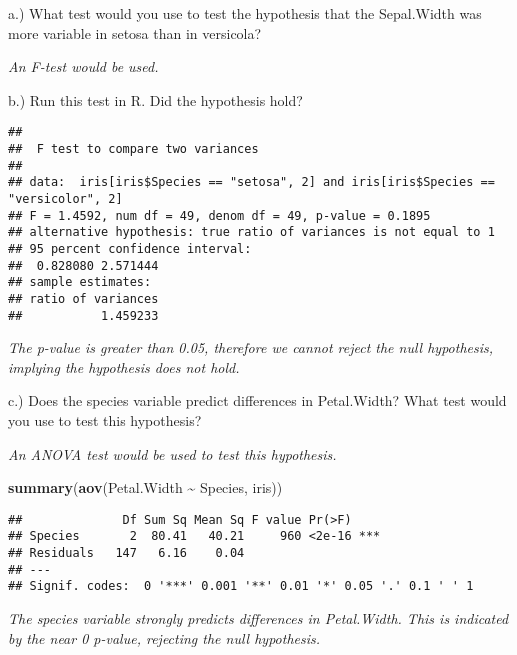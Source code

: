 \documentclass[
]{article}
\newenvironment{Shaded}{\begin{snugshade}}{\end{snugshade}}
\newcommand{\DecValTok}[1]{\textcolor[rgb]{0.00,0.00,0.81}{#1}}
\newcommand{\FunctionTok}[1]{\textcolor[rgb]{0.13,0.29,0.53}{\textbf{#1}}}
\newcommand{\NormalTok}[1]{#1}
\newcommand{\SpecialCharTok}[1]{\textcolor[rgb]{0.81,0.36,0.00}{\textbf{#1}}}
\newcommand{\StringTok}[1]{\textcolor[rgb]{0.31,0.60,0.02}{#1}}
\begin{document}
a.) What test would you use to test the hypothesis that the Sepal.Width
was more variable in setosa than in versicola?

\emph{An F-test would be used.}

b.) Run this test in R. Did the hypothesis hold?

\begin{Shaded}
\end{Shaded}

\begin{verbatim}
## 
##  F test to compare two variances
## 
## data:  iris[iris$Species == "setosa", 2] and iris[iris$Species == "versicolor", 2]
## F = 1.4592, num df = 49, denom df = 49, p-value = 0.1895
## alternative hypothesis: true ratio of variances is not equal to 1
## 95 percent confidence interval:
##  0.828080 2.571444
## sample estimates:
## ratio of variances 
##           1.459233
\end{verbatim}

\emph{The p-value is greater than 0.05, therefore we cannot reject the
null hypothesis, implying the hypothesis does not hold.}

c.) Does the species variable predict differences in Petal.Width? What
test would you use to test this hypothesis?

\emph{An ANOVA test would be used to test this hypothesis.}

\begin{Shaded}
\begin{Highlighting}[]
\FunctionTok{summary}\NormalTok{(}\FunctionTok{aov}\NormalTok{(Petal.Width }\SpecialCharTok{\textasciitilde{}}\NormalTok{ Species, iris))}
\end{Highlighting}
\end{Shaded}

\begin{verbatim}
##              Df Sum Sq Mean Sq F value Pr(>F)    
## Species       2  80.41   40.21     960 <2e-16 ***
## Residuals   147   6.16    0.04                   
## ---
## Signif. codes:  0 '***' 0.001 '**' 0.01 '*' 0.05 '.' 0.1 ' ' 1
\end{verbatim}

\emph{The species variable strongly predicts differences in Petal.Width.
This is indicated by the near 0 p-value, rejecting the null hypothesis.}
\end{document}
